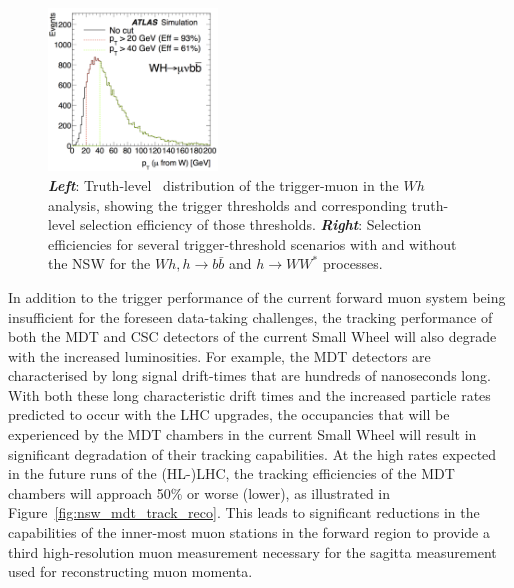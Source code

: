 \begin{figure}[!htb]
    \begin{center}
        \includegraphics[width=0.4\textwidth]{figures/nsw/nsw_ptmu_wh}
        \caption{
            \textit{\textbf{Left}}: Truth-level \pT~distribution of the trigger-muon in the $Wh$ analysis, showing
                the trigger thresholds and corresponding truth-level selection efficiency of those thresholds.
            \textit{\textbf{Right}}: Selection efficiencies for several trigger-threshold scenarios with and without the NSW
                for the $Wh,h\rightarrow b \bar{b}$ and $h \rightarrow WW^*$ processes.
        }
        \label{fig:nsw_wh_loss}
    \end{center}
\end{figure}

In addition to the trigger performance of the current forward muon system being insufficient
for the foreseen data-taking challenges, the tracking performance of both the MDT and CSC detectors of the current Small Wheel
will also degrade with the increased luminosities.
For example, the MDT detectors are characterised by long signal drift-times that are hundreds of nanoseconds long.
With both these long characteristic drift times and the increased particle rates predicted to occur with the LHC upgrades,
the occupancies that will be experienced by the MDT chambers in the current Small Wheel
will result in significant degradation of their tracking capabilities.
At the high rates expected in the future runs of the (HL-)LHC, the tracking efficiencies
of the MDT chambers will approach 50\% or worse (lower), as illustrated in Figure~\ref{fig:nsw_mdt_track_reco}.
This leads to significant reductions in the capabilities of the inner-most muon stations
in the forward region to provide a third high-resolution muon measurement necessary for the sagitta measurement used for reconstructing
muon momenta.

